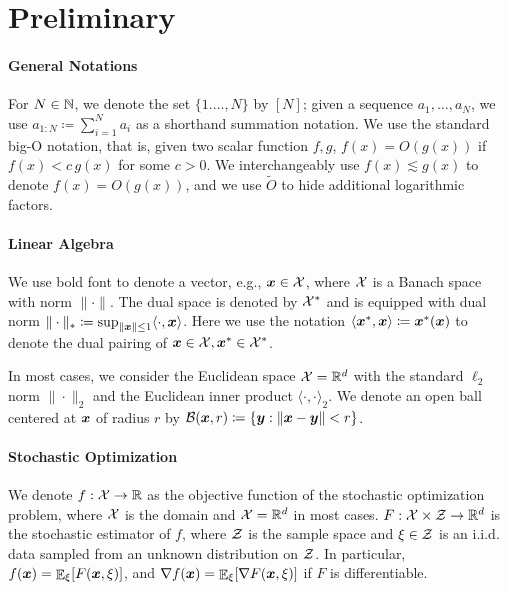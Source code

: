 \section{Preliminary}
\label{sec:ch1:prelim}

\paragraph{General Notations}
For $N\in\mathbb N$, we denote the set $\{1.\ldots,N\}$ by $[N]$; given a sequence $a_1,\ldots,a_N$, we use $a_{1:N}\coloneqq \sum_{i=1}^N a_i$ as a shorthand summation notation. We use the standard big-O notation, that is, given two scalar function $f,g$, $f(x) = O(g(x))$ if $f(x) < c\, g(x)$ for some $c>0$. We interchangeably use $f(x) \lesssim g(x)$ to denote $f(x) = O(g(x))$, and we use $\tilde O$ to hide additional logarithmic factors.

\paragraph{Linear Algebra}
We use bold font to denote a vector, e.g., ${\boldsymbol{x}}\in{\cal X}$, where ${\cal X}$ is a Banach space with norm $\|\cdot\|$. The dual space is denoted by ${\cal X}^\ast$ and is equipped with dual norm $\|\cdot\|_\ast\coloneqq \sup_{\|{\boldsymbol{x}}\|\le 1} \langle \cdot, {\boldsymbol{x}}\rangle$. Here we use the notation $\langle {\boldsymbol{x}}^\ast,{\boldsymbol{x}}\rangle\coloneqq {\boldsymbol{x}}^\ast({\boldsymbol{x}})$ to denote the dual pairing of ${\boldsymbol{x}}\in{\cal X},{\boldsymbol{x}}^\ast\in{\cal X}^\ast$. 

In most cases, we consider the Euclidean space ${\cal X}=\mathbb R^d$ with the standard $\ell_2$ norm $\|\cdot\|_2$ and the Euclidean inner product $\langle\cdot,\cdot\rangle_2$. We denote an open ball centered at ${\boldsymbol{x}}$ of radius $r$ by ${\cal B}({\boldsymbol{x}},r) \coloneqq \{{\boldsymbol{y}} : \|{\boldsymbol{x}}-{\boldsymbol{y}}\| < r\}$. 

\paragraph{Stochastic Optimization}
We denote $f:{\cal X}\to\mathbb R$ as the objective function of the stochastic optimization problem, where ${\cal X}$ is the domain and ${\cal X}=\mathbb R^d$ in most cases. $F:{\cal X}\times{\cal Z} \to \mathbb R^d$ is the stochastic estimator of $f$, where ${\cal Z}$ is the sample space and $\xi\in{\cal Z}$ is an i.i.d. data sampled from an unknown distribution on ${\cal Z}$. In particular, $f({\boldsymbol{x}}) = \mathop{\mathbb{E}}_\xi[F({\boldsymbol{x}},\xi)]$, and $\nabla f({\boldsymbol{x}}) = \mathop{\mathbb{E}}_\xi[\nabla F({\boldsymbol{x}},\xi)]$ if $F$ is differentiable.

